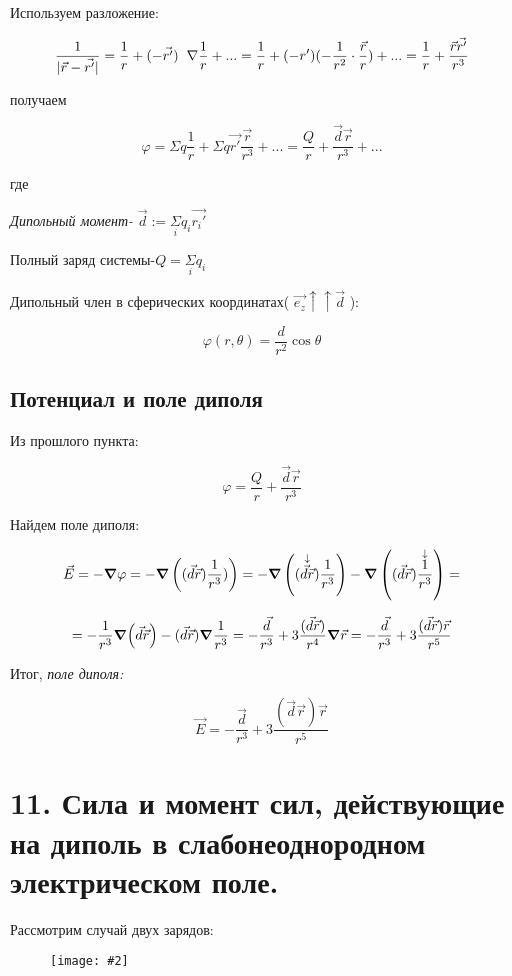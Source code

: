 \documentclass[a4paper,12pt]{article}
\newcommand{\kr}[1]{\textit{#1}}
\newcommand{\fc}[1]{\[#1\]}
\newcommand{\gradd}{\hspace{0.2cm}\scriptsize \nabla}
\newcommand{\imc}[2][0.7\textwidth]{%
    \begin{figure}[h!]
        \centering
        \texttt{[image: \#2]}
    \end{figure}%
}
\begin{document}
\newpage

Используем разложение:

\fc{\frac{1}{|\vec{r}-\vec{r'}|}=\frac{1}{r}+(-\vec{r'})\gradd\frac{1}{r}+...=\frac{1}{r}+(-r')(-\frac{1}{r^2}\cdot\frac{\vec{r}}{r})+...=\frac{1}{r}+\frac{\vec{r}\vec{r'}}{r^3}}

получаем

\fc{\varphi=\Sigma q\frac{1}{r}+\Sigma q\vec{r'}\frac{\vec{r}}{r^3}+...=\frac{Q}{r}+\frac{\vec{d}\vec{r}}{r^3}+...}

где

\kr{Дипольный момент-} $\vec{d}:=\underset{i}{\Sigma}q_i\vec{r_i'}$

Полный заряд системы-$Q=\underset{i}{\Sigma}q_i$

Дипольный член в сферических координатах( $\vec{e_z}\uparrow\uparrow\vec{d}$ ):

\fc{\varphi(r,\theta)=\frac{d}{r^2}\cos \theta}

\subsection*{Потенциал и поле диполя}

Из прошлого пункта:

\fc{\varphi=\frac{Q}{r}+\frac{\vec{d}\vec{r}}{r^3}}

Найдем поле диполя:

\fc{\vec{E}=-\grad \varphi=-\grad \left((\vec{d}\vec{r})\frac{1}{r^3})\right)=-\grad \left(\overset{\downarrow}{(\vec{d}\vec{r})}\frac{1}{r^3}\right)-\grad \left((\vec{d}\vec{r})\overset{\downarrow}{\frac{1}{r^3}}\right)=}

\fc{=-\frac{1}{r^3}\grad (\vec{d}\vec{r})-(\vec{d}\vec{r})\grad\frac{1}{r^3}=-\frac{\vec{d}}{r^3}+3\frac{(\vec{d}\vec{r})}{r^4}\grad \vec{r}=-\frac{\vec{d}}{r^3}+3\frac{(\vec{d}\vec{r})\vec{r}}{r^5}}

Итог, \kr{поле диполя:}

\fc{\vec{E}=-\frac{\vec{d}}{r^3}+3\frac{(\vec{d}\vec{r})\vec{r}}{r^5}}

\newpage

\section*{11. Сила и момент сил, действующие на диполь в слабонеоднородном
электрическом поле.}

Рассмотрим случай двух зарядов:

\imc[0.45\textwidth]{17.png}
\end{document}
